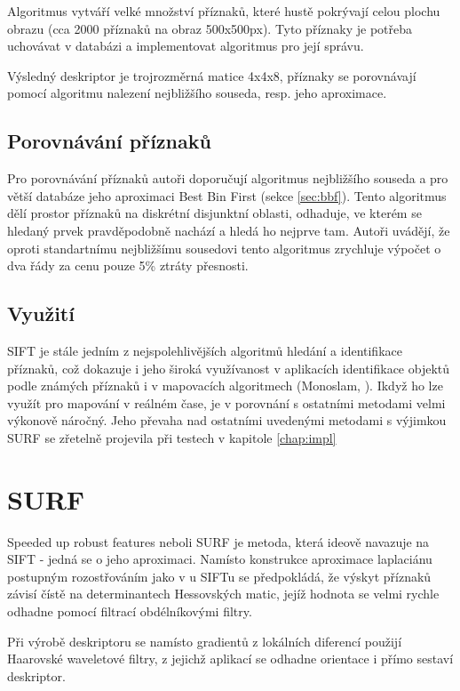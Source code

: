 	Algoritmus vytváří velké množství příznaků, které hustě pokrývají celou plochu obrazu (cca 2000 příznaků na obraz 500x500px). Tyto příznaky je potřeba uchovávat v databázi a implementovat algoritmus pro její správu.
	
	Výsledný deskriptor je trojrozměrná matice 4x4x8, příznaky se porovnávají pomocí algoritmu nalezení nejbližšího souseda, resp. jeho aproximace.
	
	\subsection{Porovnávání příznaků}
	
	Pro porovnávání příznaků autoři doporučují algoritmus nejbližšího souseda a pro větší databáze jeho aproximaci Best Bin First (sekce \ref{sec:bbf}). Tento algoritmus dělí prostor příznaků na diskrétní disjunktní oblasti, odhaduje, ve kterém se hledaný prvek pravděpodobně nachází a hledá ho nejprve tam. Autoři uvádějí, že oproti standartnímu nejbližšímu sousedovi tento algoritmus zrychluje výpočet o dva řády za cenu pouze 5\% ztráty přesnosti.
	
	\subsection{Využití}
	
	SIFT je stále jedním z nejspolehlivějších algoritmů hledání a identifikace příznaků, což dokazuje i jeho široká využívanost v aplikacích identifikace objektů podle známých příznaků i v mapovacích algoritmech (Monoslam, \cite{slam_monoslam} ). Ikdyž ho lze využít pro mapování v reálném čase, je v porovnání s ostatními metodami velmi výkonově náročný. Jeho převaha nad ostatními uvedenými metodami s výjimkou SURF se zřetelně projevila při testech v kapitole \ref{chap:impl}


\section{SURF}

	Speeded up robust features neboli SURF \cite{bay2006surf} je metoda, která ideově navazuje na SIFT - jedná se o jeho aproximaci. Namísto konstrukce aproximace laplaciánu postupným rozostřováním jako v u SIFTu se předpokládá, že výskyt příznaků závisí čístě na determinantech Hessovských matic, jejíž hodnota se velmi rychle odhadne pomocí filtrací obdélníkovými filtry.
	
	Při výrobě deskriptoru se namísto gradientů z lokálních diferencí použijí Haarovské waveletové filtry, z jejichž aplikací se odhadne orientace i přímo sestaví deskriptor. 
	
